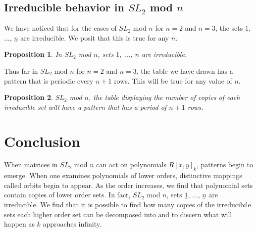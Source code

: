 \documentclass[a4paper,draft]{amsproc}
\theoremstyle{plain}
\newtheorem{prop}{Proposition}[section]
\theoremstyle{definition}
\theoremstyle{remark}
\numberwithin{equation}{section}
\begin{document}
\subsection{Irreducible behavior in $SL_{2}$ mod $n$}
We have noticed that for the cases of $SL_{2}$ mod $n$ for $n = 2$ and $n = 3$, the sets $\underline{1}$, ..., $\underline{n}$ are irreducible. We posit that this is true for any $n$. 
\begin{prop}
 In $SL_{2}$ mod $n$, sets $\underline{1}$, ..., $\underline{n}$ are irreducible. 
\end{prop}

Thus far in $SL_{2}$ mod $n$ for $n = 2$ and $n = 3$, the table we have drawn has a pattern that is periodic every $n + 1$ rows. This will be true for any value of $n$. 
\begin{prop}
$SL_{2}$ mod $n$, the table displaying the number of copies of each irreducible set will have a pattern that has a period of $n + 1$  rows. 
\end{prop}

\section{Conclusion}
When matrices in $SL_{2}$ mod $n$ can act on polynomials $R[x,y]_{k}$, patterns begin to emerge. When one examines polynomials of lower orders, distinctive mappings called orbits begin to appear. As the order increases, we find that polynomial sets contain copies of lower order sets.  In fact, $SL_{2}$ mod $n$, sets $\underline{1}$, ..., $\underline{n}$ are irreducible. We find that it is possible to find how many copies of the irreducibile sets each higher order set can be decomposed into and to discern what will happen as $k$ approaches infinity.

\end{document}
